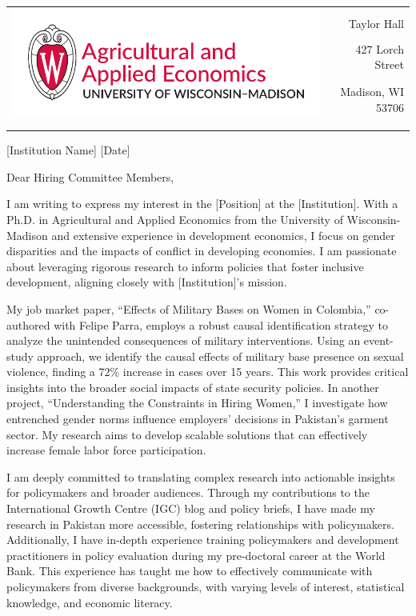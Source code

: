 \documentclass[12pt]{letter}
\begin{document}
\begin{tabularx}{\textwidth}{Xr}
\multirow{4}{*}{\includegraphics[height=3\baselineskip]{logo_cropped.pdf}} &  \\
& Taylor Hall \\
& 427 Lorch Street \\
& Madison, WI 53706 \\
[-1.8ex]\\
\\
\end{tabularx}

[Institution Name] \hfill [Date] \\

\medskip

Dear Hiring Committee Members,

I am writing to express my interest in the [Position] at the [Institution]. 
With a Ph.D. in Agricultural and Applied Economics from the University of Wisconsin-Madison and extensive experience 
in development economics, I focus on gender disparities and the impacts of conflict in developing economies. 
I am passionate about leveraging rigorous research to inform policies that foster inclusive development, 
aligning closely with [Institution]'s mission.

My job market paper, ``Effects of Military Bases on Women in Colombia,'' co-authored with Felipe Parra, employs 
a robust causal identification strategy to analyze the unintended consequences of military interventions. 
Using an event-study approach, we identify the causal effects of military base presence on sexual violence, finding 
a 72\% increase in cases over 15 years. This work provides critical insights into the broader social impacts of 
state security policies. In another project, ``Understanding the Constraints in Hiring Women,'' I investigate how entrenched gender 
norms influence employers' decisions in Pakistan's garment sector. 
My research aims to develop scalable solutions that can effectively increase female labor force participation.

I am deeply committed to translating complex research into actionable insights for policymakers and broader audiences. 
Through my contributions to the International Growth Centre (IGC) blog and policy briefs, I have made my research in Pakistan more accessible, 
fostering relationships with policymakers. Additionally, I have in-depth experience training policymakers and development practitioners 
in policy evaluation during my pre-doctoral career at the World Bank. This experience has taught me how to effectively communicate 
with policymakers from diverse backgrounds, with varying levels of interest, statistical knowledge, and economic literacy.
\end{document}
